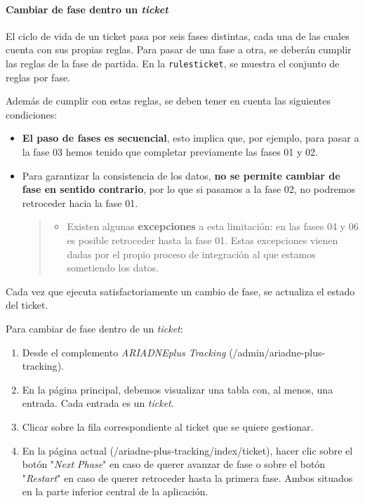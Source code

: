 \documentclass[
]{article}
\providecommand{\tightlist}{%
  \setlength{\itemsep}{0pt}\setlength{\parskip}{0pt}}
\begin{document}
\hypertarget{cambiar-de-fase-dentro-un-ticket}{%
\paragraph{\texorpdfstring{Cambiar de fase dentro un
\emph{ticket}}{Cambiar de fase dentro un ticket}}\label{cambiar-de-fase-dentro-un-ticket}}

El ciclo de vida de un ticket pasa por seis fases distintas, cada una de
las cuales cuenta con sus propias reglas. Para pasar de una fase a otra,
se deberán cumplir las reglas de la fase de partida. En la
\texttt{rulesticket}, se muestra el conjunto de reglas por fase.

Además de cumplir con estas reglas, se deben tener en cuenta las
siguientes condiciones:

\begin{itemize}
\item
  \textbf{El paso de fases es secuencial}, esto implica que, por
  ejemplo, para pasar a la fase 03 hemos tenido que completar
  previamente las fases 01 y 02.
\item
  Para garantizar la consistencia de los datos, \textbf{no se permite
  cambiar de fase en sentido contrario}, por lo que si pasamos a la fase
  02, no podremos retroceder hacia la fase 01.

  \begin{quote}
  \begin{itemize}
  \tightlist
  \item
    Existen algunas \textbf{excepciones} a esta limitación: en las fases
    04 y 06 es posible retroceder hasta la fase 01. Estas excepciones
    vienen dadas por el propio proceso de integración al que estamos
    sometiendo los datos.
  \end{itemize}
  \end{quote}
\end{itemize}

Cada vez que ejecuta satisfactoriamente un cambio de fase, se actualiza
el estado del ticket.

Para cambiar de fase dentro de un \emph{ticket}:

\begin{enumerate}
\def\labelenumi{\arabic{enumi}.}
\tightlist
\item
  Desde el complemento \emph{ARIADNEplus Tracking}
  ({/admin/ariadne-plus-tracking}).
\item
  En la página principal, debemos visualizar una tabla con, al menos,
  una entrada. Cada entrada es un \emph{ticket}.
\item
  Clicar sobre la fila correspondiente al ticket que se quiere
  gestionar.
\item
  En la página actual ({/ariadne-plus-tracking/index/ticket}), hacer
  clic sobre el botón "\emph{Next Phase}" en caso de querer avanzar de
  fase o sobre el botón "\emph{Restart}" en caso de querer retroceder
  hasta la primera fase. Ambos situados en la parte inferior central de
  la aplicación.
\end{enumerate}
\end{document}
